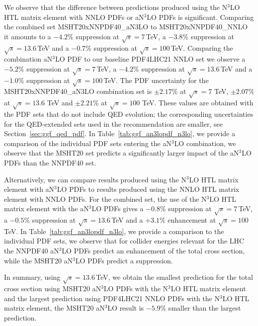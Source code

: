 We observe that the difference between predictions produced using the N$^3$LO HTL matrix element with NNLO PDFs or aN$^3$LO PDFs is significant.
Comparing the combined set MSHT20xNNPDF40\_aN3LO to MSHT20xNNPDF40\_NNLO it amounts to a $-4.2\%$ suppression at $\sqrt{s}=7$\,TeV, a $-3.8\%$ suppression at $\sqrt{s}=13.6$\,TeV and a $-0.7\%$ suppression at $\sqrt{s}=100$\,TeV.
Comparing the combination aN$^3$LO PDF to our baseline PDF4LHC21 NNLO set we observe a $-5.2\%$ suppression at $\sqrt{s}=7$\,TeV, a $-4.2\%$ suppression at $\sqrt{s}=13.6$\,TeV and a $-1.0\%$ suppression at $\sqrt{s}=100$\,TeV.
The PDF uncertainty for the MSHT20xNNPDF40\_aN3LO combination set is $\pm 2.17\%$ at $\sqrt{s}=7$ TeV, $\pm 2.07\%$ at $\sqrt{s}=13.6$ TeV and $\pm 2.21\%$ at $\sqrt{s}=100$ TeV.
These values are obtained with the PDF sets that do not include QED evolution; the corresponding uncertainties for the QED-extended sets used in the recommendation are smaller, see Section~\ref{sec:ggf_qed_pdf}.
In Table~\ref{tab:ggf_an3lopdf_n3lo}, we provide a comparison of the individual PDF sets entering the aN$^3$LO combination, we observe that the MSHT20 set predicts a significantly larger impact of the aN$^3$LO PDFs than the NNPDF40 set.

Alternatively, we can compare results produced using the N$^3$LO HTL matrix element with aN$^3$LO PDFs to results produced using the NNLO HTL matrix element with NNLO PDFs.
For the combined set, the use of the N$^3$LO HTL matrix element with the aN$^3$LO PDFs gives a $-0.8\%$ suppression at $\sqrt{s}=7$\,TeV, a $-0.5\%$ suppression at $\sqrt{s}=13.6$\,TeV and a $+3.1\%$ enhancement at $\sqrt{s}=100$\,TeV.
In Table~\ref{tab:ggf_an3lopdf_n3lo}, we provide a comparison to the individual PDF sets, we observe that for collider energies relevant for the LHC the NNPDF40 aN$^3$LO PDFs predict an enhancement of the total cross section, while the MSHT20 aN$^3$LO PDFs predict a suppression.

In summary, using $\sqrt{s}=13.6$\,TeV, we obtain the smallest prediction for the total cross section using MSHT20 aN$^3$LO PDFs with the N$^3$LO HTL matrix element and the largest prediction using PDF4LHC21 NNLO PDFs with the N$^3$LO HTL matrix element, the MSHT20 aN$^3$LO result is $-5.9\%$ smaller than the largest prediction.

